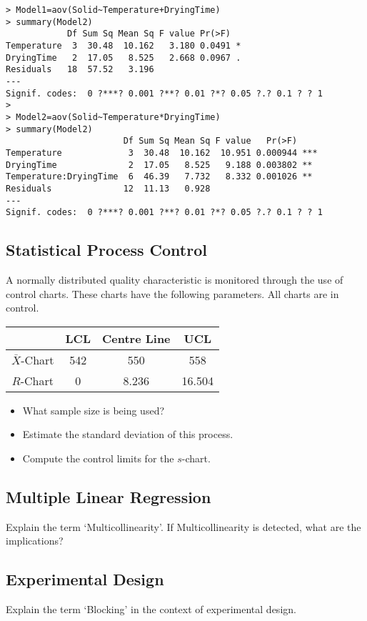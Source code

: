 \documentclass{article}
\begin{document}
\newpage
\begin{verbatim}
> Model1=aov(Solid~Temperature+DryingTime)
> summary(Model2)
            Df Sum Sq Mean Sq F value Pr(>F)  
Temperature  3  30.48  10.162   3.180 0.0491 *
DryingTime   2  17.05   8.525   2.668 0.0967 .
Residuals   18  57.52   3.196                 
---
Signif. codes:  0 ?***? 0.001 ?**? 0.01 ?*? 0.05 ?.? 0.1 ? ? 1 
> 
> Model2=aov(Solid~Temperature*DryingTime)
> summary(Model2)
                       Df Sum Sq Mean Sq F value   Pr(>F)    
Temperature             3  30.48  10.162  10.951 0.000944 ***
DryingTime              2  17.05   8.525   9.188 0.003802 ** 
Temperature:DryingTime  6  46.39   7.732   8.332 0.001026 ** 
Residuals              12  11.13   0.928                     
---
Signif. codes:  0 ?***? 0.001 ?**? 0.01 ?*? 0.05 ?.? 0.1 ? ? 1 
\end{verbatim}
\newpage
\subsection{Statistical Process Control}
A normally distributed quality characteristic is monitored through the use of control charts. These charts have the 
following parameters. All charts are in control.
\begin{tabular}{|c|c|c|c|}
\hline  & LCL & Centre Line & UCL \\ 
\hline $\bar{X}$-Chart & 542 & 550 & 558 \\ 
\hline $R$-Chart & 0 & 8.236 & 16.504 \\ 
\hline 
\end{tabular} 
\begin{itemize}
\item What sample size is being used?
\item Estimate the standard deviation of this process.
\item Compute the control limits for the $s$-chart.
\end{itemize}
\subsection{Multiple Linear Regression}
Explain the term `Multicollinearity'. If Multicollinearity is detected, what are the implications?

\subsection{Experimental Design}
Explain the term `Blocking' in the context of experimental design.
\end{document}
